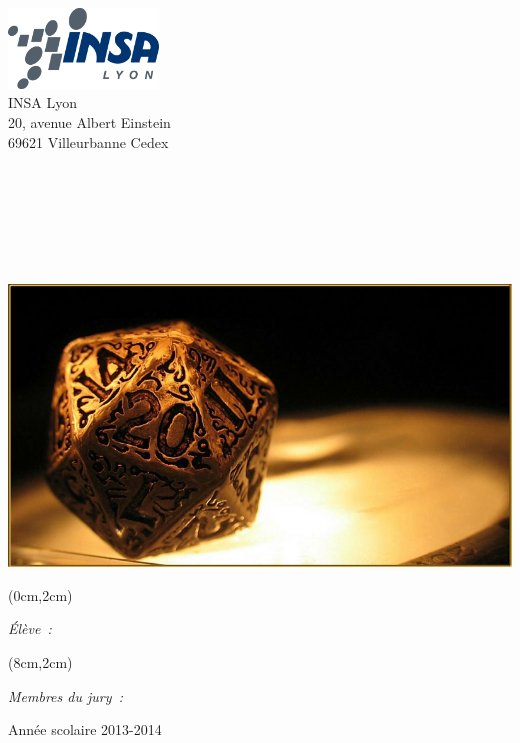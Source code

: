 \begin{center}
	\thispagestyle{empty}
	\begin{minipage}[t]{0.48\textwidth}
	  \begin{flushleft}
	    \includegraphics [width=40mm]{img/insa_logo.png} \\[0.5cm]
			INSA Lyon\\
			20, avenue Albert Einstein\\
			69621 Villeurbanne Cedex
	  \end{flushleft}
	\end{minipage}
	\begin{minipage}[t]{0.48\textwidth}
	  \begin{flushright}
	  \end{flushright}
	\end{minipage} \\[2cm]

	\textsc{\Large \reportsubject}\\[0.3cm]
	\HRule \\[0.4cm]
	{\Huge \bfseries \reporttitle}\\[0.6cm]
	{\Large \dateperiod}\\[0.4cm]
	\HRule \\[1cm]

	\includegraphics [width=0.6\linewidth]{img/die.jpg} \\[0.7cm]

	\begin{textblock*}{8cm}(0cm,2cm)
		\begin{flushleft}
	 	\noindent \Large \emph{Élève~:} \\
		\reportauthor
		\end{flushleft}
	\end{textblock*}

	\begin{textblock*}{8cm}(8cm,2cm)
		\begin{flushright}
	 	\noindent \Large \emph{Membres du jury~:} \\
	    	\enseignants
		\end{flushright}
	\end{textblock*}

	\vfill
	\large Année scolaire 2013-2014
	\clearpage
\end{center}
